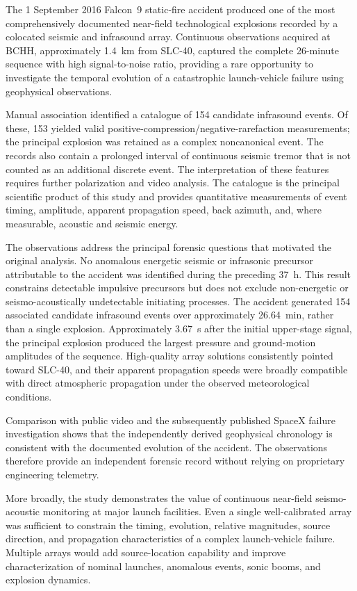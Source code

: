 \documentclass[]{seismica}
\begin{document}
The 1 September 2016 Falcon~9 static-fire accident produced one of the most comprehensively documented near-field technological explosions recorded by a colocated seismic and infrasound array. Continuous observations acquired at BCHH, approximately 1.4~km from SLC-40, captured the complete 26-minute sequence with high signal-to-noise ratio, providing a rare opportunity to investigate the temporal evolution of a catastrophic launch-vehicle failure using geophysical observations.

Manual association identified a catalogue of 154 candidate infrasound events.
Of these, 153 yielded valid positive-compression/negative-rarefaction
measurements; the principal explosion was retained as a complex noncanonical
event. The records also contain a prolonged interval of continuous seismic
tremor that is not counted as an additional discrete event. The interpretation of these features
requires further polarization and video analysis. The catalogue is the
principal scientific product of this study and provides quantitative
measurements of event timing, amplitude, apparent propagation speed, back
azimuth, and, where measurable, acoustic and seismic energy.

The observations address the principal forensic questions that motivated the
original analysis. No anomalous energetic seismic or infrasonic precursor
attributable to the accident was identified during the preceding 37~h. This
result constrains detectable impulsive precursors but does not exclude
non-energetic or seismo-acoustically undetectable initiating processes. The accident generated 154 associated candidate infrasound events over
approximately 26.64~min, rather than a single explosion. Approximately 3.67~s
after the initial upper-stage signal, the principal explosion produced the largest
pressure and ground-motion amplitudes of the sequence. High-quality array
solutions consistently pointed toward SLC-40, and their apparent propagation
speeds were broadly compatible with direct atmospheric propagation under the
observed meteorological conditions.

Comparison with public video and the subsequently published SpaceX failure investigation shows that the independently derived geophysical chronology is consistent with the documented evolution of the accident. The observations therefore provide an independent forensic record without relying on proprietary engineering telemetry.

More broadly, the study demonstrates the value of continuous near-field
seismo-acoustic monitoring at major launch facilities. Even a single
well-calibrated array was sufficient to constrain the timing, evolution,
relative magnitudes, source direction, and propagation characteristics of a
complex launch-vehicle failure. Multiple arrays would add source-location
capability and improve characterization of nominal launches, anomalous events,
sonic booms, and explosion dynamics.
\end{document}

